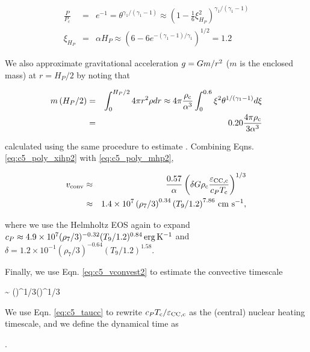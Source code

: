 \begin{eqnarray}
\frac{P}{P_\mathrm{c}} &=& e^{-1} = \theta^{\gamma_1/(\gamma_1 - 1)} \approx \left(1 - \frac{1}{6}\xi_{H_P}^2\right)^{\gamma_1/(\gamma_1 - 1)}  \nonumber \\
\xi_{H_P} &=& \alpha H_P \approx \left(6 - 6e^{-(\gamma_1 - 1)/\gamma_1}\right)^{1/2} = 1.2
\label{eq:c5_poly_xihp2}
\end{eqnarray}

\noindent We also approximate gravitational acceleration $\gacc = Gm/r^2$ ($m$ is the enclosed mass) at $r = H_P/2$ by noting that

\begin{eqnarray}
m\left(H_P/2\right) &=& \int_0^{H_P/2} 4\pi r^2\rho dr \approx 4\pi\frac{\rhoc}{\alpha^3}\int_0^{0.6}\xi^2\theta^{1/(\gamma_1 - 1)}d\xi \nonumber \\
&=& 0.20\frac{4\pi\rhoc}{3\alpha^3} 
\label{eq:c5_poly_mhp2}
\end{eqnarray}

\noindent calculated using the same procedure to estimate \Lconv.  Combining Eqns. \ref{eq:c5_poly_xihp2} with \ref{eq:c5_poly_mhp2},

\begin{eqnarray}
\vconv &\approx& \frac{0.57}{\alpha}\left(\delta G\rhoc\frac{\epscentral}{c_P \Tc}\right)^{1/3} \nonumber \\
&\approx& 1.4\times10^{7}\left(\rho_7/3\right)^{0.34}\left(T_9/1.2\right)^{7.86}\,\cmpsec,
\label{eq:c5_vconvest2}
\end{eqnarray}

\noindent where we use the Helmholtz EOS again to expand $c_P \approx 4.9\times10^7(\rho_7/3)^{-0.32}(T_9/1.2)^{0.84}\,\mathrm{erg}\,\mathrm{K}^{-1}$ and $\delta = 1.2\times10^{-1}(\rho_7/3)^{-0.64}(T_9/1.2)^{1.58}$.

Finally, we use Eqn. \ref{eq:c5_vconvest2} to estimate the convective timescale

\eqbegin
\tauconv \sim {} \approx {}\left(\right)^{1/3}\left(\right)^{1/3}
\label{eq:c5_tauconvest}
\eqend

\noindent We use Eqn. \ref{eq:c5_taucc} to rewrite $c_P\Tc/\epscentral$ as the (central) nuclear heating timescale, and we define the dynamical time as

\eqbegin
\taudyn \equiv {}.
\label{eq:c5_taudyn}
\eqend


